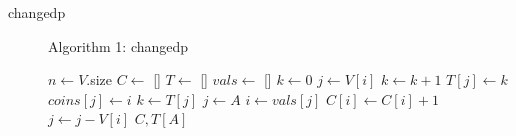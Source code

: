 \documentclass[paper=a4, fontsize=11pt]{scrartcl} %
\numberwithin{equation}{section} %
\numberwithin{figure}{section} %
\numberwithin{table}{section} %
\begin{document}
\begin{enumerate}
\begin{description}
        \item[changedp]
        \begin{algorithmc}
            \caption{Algorithm 1: changedp}
                \State $n \gets V$.size
                \State $C \gets$ []
                \State $T \gets$ []
                \State $vals \gets$ []
                    \State $k \gets 0$
                    \State $j \gets V[i]$
                        \State $k \gets k + 1$
                            \State $T[j] \gets k$
                            \State $coins[j] \gets i$
                        \Else
                            \State $k \gets T[j]$
                        \EndIf
                    \EndWhile
                \EndFor
                \State $j \gets A$
                    \State $i \gets vals[j]$
                    \State $C[i] \gets C[i] + 1$
                    \State $j \gets j - V[i]$
                \EndWhile
                \Return $C, T[A]$
            \EndFunction
        \end{algorithmc}
    \end{description}
\end{enumerate}
\end{document}
